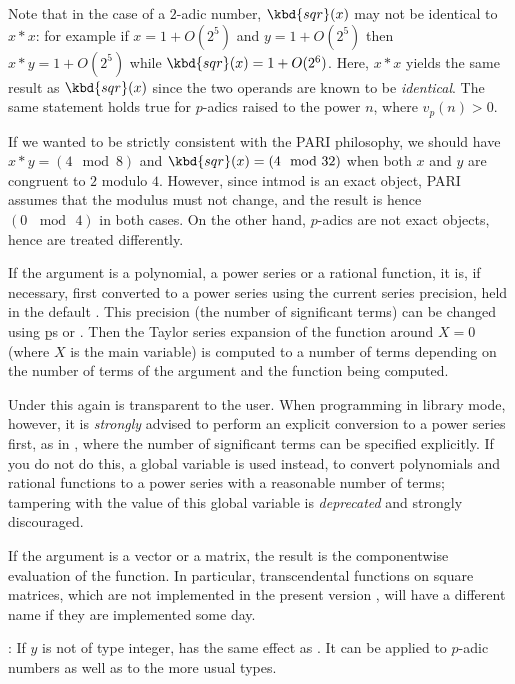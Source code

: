 Note that in the case of a $2$-adic number, $\kbd{sqr}(x)$ may not be
identical to $x*x$: for example if $x = 1+O(2^5)$ and $y = 1+O(2^5)$ then
$x*y = 1+O(2^5)$ while $\kbd{sqr}(x) = 1+O(2^6)$. Here, $x * x$ yields the
same result as $\kbd{sqr}(x)$ since the two operands are known to be
\emph{identical}. The same statement holds true for $p$-adics raised to the
power $n$, where $v_p(n) > 0$.

 If we wanted to be strictly consistent with
the PARI philosophy, we should have $x*y = (4 \mod 8)$ and $\kbd{sqr}(x) =
(4 \mod 32)$ when both $x$ and $y$ are congruent to $2$ modulo $4$.
However, since intmod is an exact object, PARI assumes that the modulus
must not change, and the result is hence $(0\, \mod\, 4)$ in both cases. On
the other hand, $p$-adics are not exact objects, hence are treated
differently.

\item If the argument is a polynomial, a power series or a rational function,
it is, if necessary, first converted to a power series using the current
series precision, held in the default . This precision
(the number of significant terms) can be changed using \b{ps} or
. Then the Taylor series expansion of the
function around $X=0$ (where $X$ is the main variable) is computed to a
number of terms depending on the number of terms of the argument and the
function being computed.

Under  this again is transparent to the user. When programming in
library mode, however, it is \emph{strongly} advised to perform an explicit
conversion to a power series first, as in ,
where the number of significant terms  can be specified
explicitly. If you do not do this, a global variable  is used
instead, to convert polynomials and rational functions to a power series with
a reasonable number of terms; tampering with the value of this global
variable is \emph{deprecated} and strongly discouraged.


\item If the argument is a vector or a matrix, the result is the
componentwise evaluation of the function. In particular, transcendental
functions on square matrices, which are not implemented in the present
version \vers, will have a different name if they are implemented some day.

\subseckbd{\pow}: If $y$ is not of type integer,  has the same
effect as . It can be applied to $p$-adic numbers as well
as to the more usual types.

